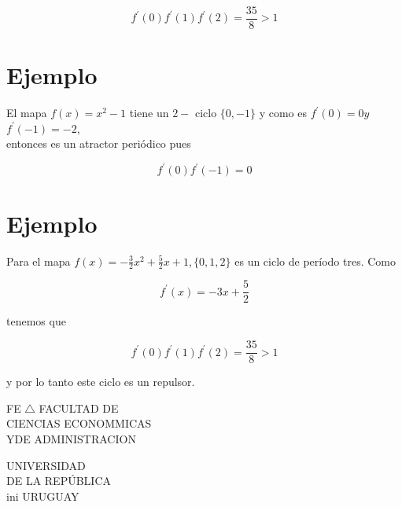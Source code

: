 \documentclass[11pt]{beamer}
\begin{document}
$$
f^{\prime}(0) f^{\prime}(1) f^{\prime}(2)=\frac{35}{8}>1
$$

\section*{Ejemplo}
El mapa $f(x)=x^{2}-1$ tiene un $2-$ ciclo $\{0,-1\}$ y como es $f^{\prime}(0)=0 y$ $f^{\prime}(-1)=-2$,\\
entonces es un atractor periódico pues

$$
f^{\prime}(0) f^{\prime}(-1)=0
$$

\section*{Ejemplo}
Para el mapa $f(x)=-\frac{3}{2} x^{2}+\frac{5}{2} x+1,\{0,1,2\}$ es un ciclo de período tres. Como

$$
f^{\prime}(x)=-3 x+\frac{5}{2}
$$

tenemos que

$$
f^{\prime}(0) f^{\prime}(1) f^{\prime}(2)=\frac{35}{8}>1
$$

y por lo tanto este ciclo es un repulsor.

FE $\triangle$ FACULTAD DE\\
CIENCIAS ECONOMMICAS\\
YDE ADMINISTRACION

UNIVERSIDAD\\
DE LA REPÚBLICA\\
ini URUGUAY
\end{document}
